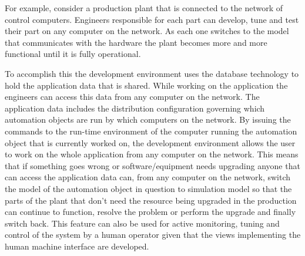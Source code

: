 For example, consider a production plant that is connected
to the network of control computers. Engineers responsible
for each part can develop, tune and test their part on any
computer on the network. As each one switches to the model
that communicates with the hardware the plant becomes more
and more functional until it is fully operational.

To accomplish this the development environment uses the
database technology to hold the application data that is
shared. While working on the application the engineers can
access this data from any computer on the network. The
application data includes the distribution configuration
governing which automation objects are run by which
computers on the network. By issuing the commands to the
run-time environment of the computer running the automation
object that is currently worked on, the development
environment allows the user to work on the whole application
from any computer on the network. This means that if
something goes wrong or software/equipment needs upgrading
anyone that can access the application data can, from any
computer on the network, switch the model of the automation
object in question to simulation model so that the parts of
the plant that don't need the resource being upgraded in the
production can continue to function, resolve the problem or
perform the upgrade and finally switch back. This feature
can also be used for active monitoring, tuning and control
of the system by a human operator given that the views
implementing the human machine interface are developed.

